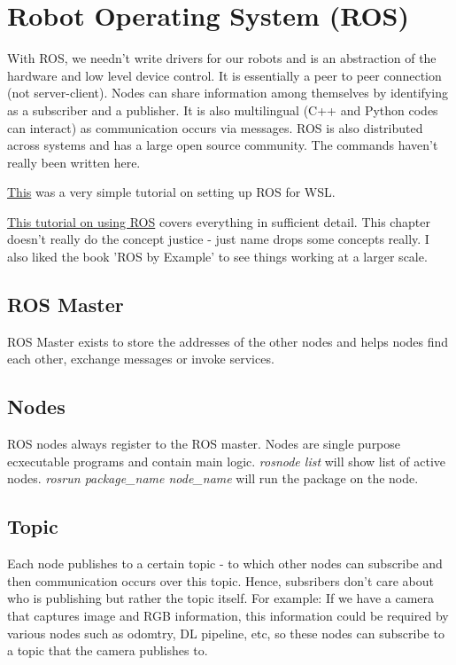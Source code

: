 \chapter{Robot Operating System (ROS)}

With ROS, we needn't write drivers for our robots and is an abstraction of the hardware and low level device control. It is essentially a peer to peer connection (not server-client). Nodes can share information among themselves by identifying as a subscriber and a publisher. It is also multilingual (C++ and Python codes can interact) as communication occurs via messages. ROS is also distributed across systems and has a large open source community. The commands haven't really been written here.

\href{https://jack-kawell.com/2019/06/24/setting-up-a-ros-development-environment-in-windows/}{This} was a very simple tutorial on setting up ROS for WSL.

\href{http://wiki.ros.org/ROS/Tutorials/}{This tutorial on using ROS} covers everything in sufficient detail. This chapter doesn't really do the concept justice - just name drops some concepts really. I also liked the book 'ROS by Example' to see things working at a larger scale.

\section*{ROS Master}

ROS Master exists to store the addresses of the other nodes and helps nodes find each other, exchange messages or invoke services.

\section*{Nodes}

ROS nodes always register to the ROS master. Nodes are single purpose ecxecutable programs and contain main logic. \textit{rosnode list} will show list of active nodes. \textit{rosrun package\_name node\_name} will run the package on the node. 

\section*{Topic}

Each node publishes to a certain topic - to which other nodes can subscribe and then communication occurs over this topic. Hence, subsribers don't care about who is publishing but rather the topic itself. For example: If we have a camera that captures image and RGB information, this information could be required by various nodes such as odomtry, DL pipeline, etc, so these nodes can subscribe to a topic that the camera publishes to.

